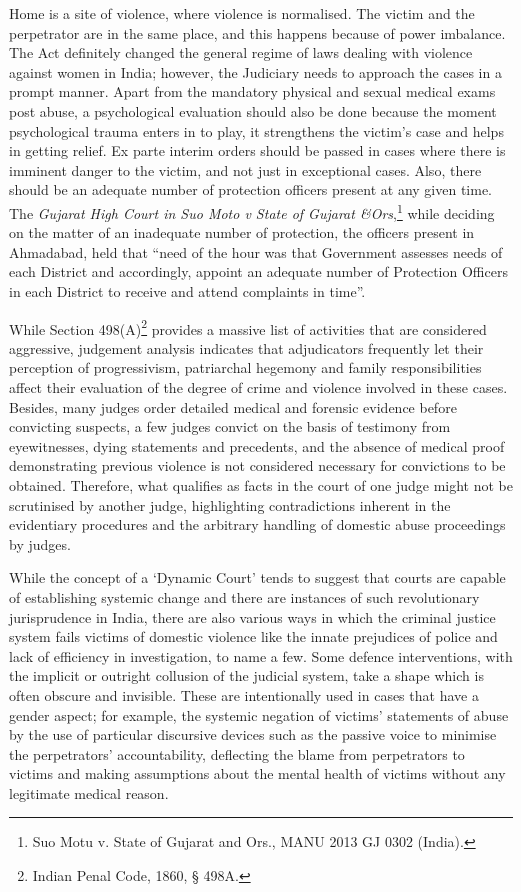 \begin{multicols}{2}
\noi
Home is a site of violence, where violence is normalised. The victim and the perpetrator are
in the same place, and this happens because of power imbalance. The Act definitely changed
the general regime of laws dealing with violence against women in India; however, the
Judiciary needs to approach the cases in a prompt manner. Apart from the mandatory
physical and sexual medical exams post abuse, a psychological evaluation should also be
done because the moment psychological trauma enters in to play, it strengthens the victim’s
case and helps in getting relief. Ex parte interim orders should be passed in cases where there
is imminent danger to the victim, and not just in exceptional cases. Also, there should be an
adequate number of protection officers present at any given time. The \textit{Gujarat High Court in
Suo Moto v State of Gujarat \&Ors},\footnote{Suo Motu v. State of Gujarat and Ors., MANU 2013 GJ 0302 (India).} while deciding on the matter of an inadequate number
of protection, the officers present in Ahmadabad, held that “need of the hour was that Government assesses needs of each District and accordingly, appoint an adequate number of
Protection Officers in each District to receive and attend complaints in time”.


\noi
While Section 498(A)\footnote{Indian Penal Code, 1860, § 498A.} provides a massive list of activities that are considered aggressive,
judgement analysis indicates that adjudicators frequently let their perception of
progressivism, patriarchal hegemony and family responsibilities affect their evaluation of the
degree of crime and violence involved in these cases. Besides, many judges order detailed
medical and forensic evidence before convicting suspects, a few judges convict on the basis
of testimony from eyewitnesses, dying statements and precedents, and the absence of medical
proof demonstrating previous violence is not considered necessary for convictions to be
obtained. Therefore, what qualifies as facts in the court of one judge might not be scrutinised
by another judge, highlighting contradictions inherent in the evidentiary procedures and the
arbitrary handling of domestic abuse proceedings by judges.

\noi
While the concept of a ‘Dynamic Court’ tends to suggest that courts are capable of
establishing systemic change and there are instances of such revolutionary jurisprudence in
India, there are also various ways in which the criminal justice system fails victims of
domestic violence like the innate prejudices of police and lack of efficiency in investigation,
to name a few. Some defence interventions, with the implicit or outright collusion of the
judicial system, take a shape which is often obscure and invisible. These are intentionally
used in cases that have a gender aspect; for example, the systemic negation of victims’
statements of abuse by the use of particular discursive devices such as the passive voice to
minimise the perpetrators’ accountability, deflecting the blame from perpetrators to victims
and making assumptions about the mental health of victims without any legitimate medical
reason. 


\end{multicols}
